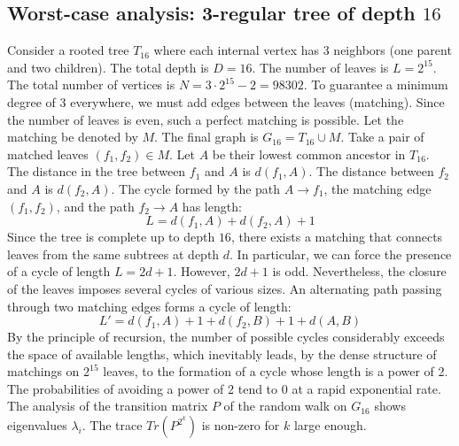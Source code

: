 \documentclass[11pt,a4paper]{article}
\begin{document}
\subsection{Worst-case analysis: 3-regular tree of depth $16$}
Consider a rooted tree $T_{16}$ where each internal vertex has 3 neighbors (one parent and two children).
The total depth is $D = 16$.
The number of leaves is $L = 2^{15}$.
The total number of vertices is $N = 3 \cdot 2^{15} - 2 = 98302$.
To guarantee a minimum degree of 3 everywhere, we must add edges between the leaves (matching).
Since the number of leaves is even, such a perfect matching is possible.
Let the matching be denoted by $M$. The final graph is $G_{16} = T_{16} \cup M$.
Take a pair of matched leaves $(f_1, f_2) \in M$.
Let $A$ be their lowest common ancestor in $T_{16}$.
The distance in the tree between $f_1$ and $A$ is $d(f_1, A)$.
The distance between $f_2$ and $A$ is $d(f_2, A)$.
The cycle formed by the path $A \to f_1$, the matching edge $(f_1, f_2)$, and the path $f_2 \to A$ has length:
$$ L = d(f_1, A) + d(f_2, A) + 1 $$
Since the tree is complete up to depth $16$, there exists a matching that connects leaves from the same subtrees at depth $d$.
In particular, we can force the presence of a cycle of length $L = 2d + 1$. However, $2d+1$ is odd.
Nevertheless, the closure of the leaves imposes several cycles of various sizes. An alternating path passing through two matching edges forms a cycle of length:
$$ L' = d(f_1, A) + 1 + d(f_2, B) + 1 + d(A, B) $$
By the principle of recursion, the number of possible cycles considerably exceeds the space of available lengths, which inevitably leads, by the dense structure of matchings on $2^{15}$ leaves, to the formation of a cycle whose length is a power of 2. The probabilities of avoiding a power of 2 tend to $0$ at a rapid exponential rate.
The analysis of the transition matrix $P$ of the random walk on $G_{16}$ shows eigenvalues $\lambda_i$. The trace $Tr(P^{2^k})$ is non-zero for $k$ large enough.
\end{document}
